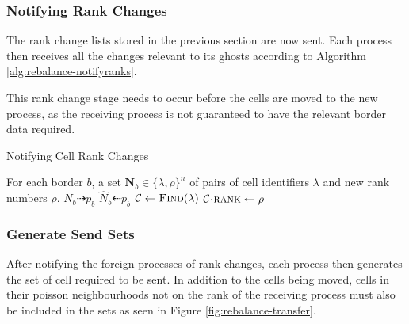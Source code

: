 \documentclass{IIBproject}
\newcommand{\vect} [1] {\bm{#1}}
\newcommand{\dra}{\dashrightarrow}
\newcommand{\dla}{\dashleftarrow}
\newcommand{\acc}{{\mkern 0.5mu\cdot\mkern 0.5mu}}
\numberwithin{figure}{section}
\begin{document}


        \subsubsection{Notifying Rank Changes} %
            \label{sec:rebalancing-notifyrank}

            The rank change lists stored in the previous section are now sent. Each process then receives all the changes relevant to its ghosts according to Algorithm \ref{alg:rebalance-notifyranks}.

            This rank change stage needs to occur before the cells are moved to the new process, as the receiving process is not guaranteed to have the relevant border data required.

            \begin{algorithm}[H]
                \caption{Notifying Cell Rank Changes}
                \label{alg:rebalance-notifyranks}

                \begin{algorithmic}
                    \Require For each border $b$, a set $\vect{N}_b \in \{\lambda,\rho\}^n$ of pairs of cell identifiers $\lambda$ and new rank numbers $\rho$.
                    \Statex
                        \Send $N_b \dra p_b$
                    \EndFor
                    \Statex
                        \Recv $\hat N_b \dla p_b$
                            \State $\mathcal{C}\gets\textproc{Find}(\lambda)$
                            \State $\mathcal{C}\acc\textproc{rank} \gets \rho$
                        \EndFor
                    \EndFor
                \end{algorithmic}
            \end{algorithm}



        \subsubsection{Generate Send Sets} %
            \label{sec:rebalancing-gensendset}

            After notifying the foreign processes of rank changes, each process then generates the set of cell required to be sent. In addition to the cells being moved, cells in their poisson neighbourhoods not on the rank of the receiving process must also be included in the sets as seen in Figure \ref{fig:rebalance-transfer}.
\end{document}
